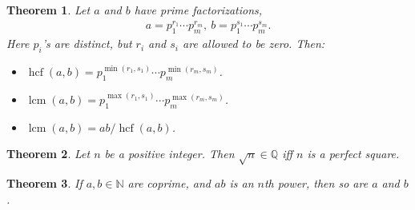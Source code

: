 \documentclass{article}
\theoremstyle{sltheorem}
\newtheorem{theorem}{Theorem}[section]
\newcommand{\N}{\mathbb{N}}
\DeclareMathOperator{\hcf}{hcf}
\DeclareMathOperator{\lcm}{lcm}
\begin{document}
\begin{theorem}
    Let $a$ and $b$ have prime factorizations,
    \begin{align*}
        a=p_1^{r_1}\cdots p_m^{r_m}, \: b=p_1^{s_1}\cdots p_m^{s_m}.
    \end{align*}
    Here $p_i$'s are distinct, but $r_i$ and $s_i$ are allowed to be zero. Then:
    \begin{itemize}
        \item $\hcf(a,b) = p_1^{\min(r_1,s_1)}\cdots p_m^{\min(r_m,s_m)}$.
        \item $\lcm(a,b) = p_1^{\max(r_1,s_1)}\cdots p_m^{\max(r_m,s_m)}$.
        \item $\lcm(a,b) = ab / \hcf(a,b)$.
    \end{itemize}
\end{theorem}
\begin{theorem}
    Let $n$ be a positive integer. Then $\sqrt{n}\in\mathbb{Q}$ iff $n$ is a perfect square.
\end{theorem}
\begin{theorem}
      If $a,b\in\N$ are coprime, and $ab$ is an $n$th power, then so are $a$ and $b$.
\end{theorem}
\end{document}
